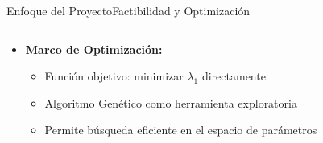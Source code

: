 \begin{frame}{Enfoque del Proyecto}{Factibilidad y Optimización}
\begin{columns}
\begin{column}{0.6\textwidth}
\begin{itemize}
\begin{itemize}
                \end{itemize}
                \item \textbf{Marco de Optimización:} %
                \begin{itemize}
                    \item Función objetivo: minimizar $\lambda_1$ directamente
                    \item Algoritmo Genético como herramienta exploratoria
                    \item Permite búsqueda eficiente en el espacio de parámetros
                \end{itemize}
            \end{itemize}
        \end{column}
    \end{columns}
\end{frame}

